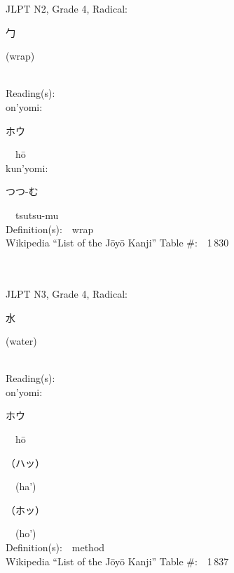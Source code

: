 \begin{multicols}{2}
{JLPT N2, Grade 4, Radical:\ \ {\begin{CJK}{UTF8}{min} 勹 \end{CJK}} (wrap) } \\
Reading(s):\ \ \\
{\hspace*{1em}}on'yomi:\ \ \\
{\hspace*{2em}}{\begin{CJK}{UTF8}{min} ホウ \end{CJK}}\ \ h\=o\ \ \\
{\hspace*{1em}}kun'yomi:\ \ \\
{\hspace*{2em}}{\begin{CJK}{UTF8}{min} つつ-む \end{CJK}}\ \ tsutsu-mu\ \ \\
Definition(s):\ \ wrap \\
Wikipedia ``List of the J\=oy\=o Kanji'' Table \#:\ \ 1\,830 \\
\ \ \\
{\fontsize{34pt}{40pt}  }\ \ \\  %
{JLPT N3, Grade 4, Radical:\ \ {\begin{CJK}{UTF8}{min} 水 \end{CJK}} (water) } \\
Reading(s):\ \ \\
{\hspace*{1em}}on'yomi:\ \ \\
{\hspace*{2em}}{\begin{CJK}{UTF8}{min} ホウ \end{CJK}}\ \ h\=o\ \ \\
{\hspace*{2em}}{\begin{CJK}{UTF8}{min} （ハッ） \end{CJK}}\ \ (ha')\ \ \\
{\hspace*{2em}}{\begin{CJK}{UTF8}{min} （ホッ） \end{CJK}}\ \ (ho')\ \ \\
Definition(s):\ \ method \\
Wikipedia ``List of the J\=oy\=o Kanji'' Table \#:\ \ 1\,837 \\

\end{multicols}
